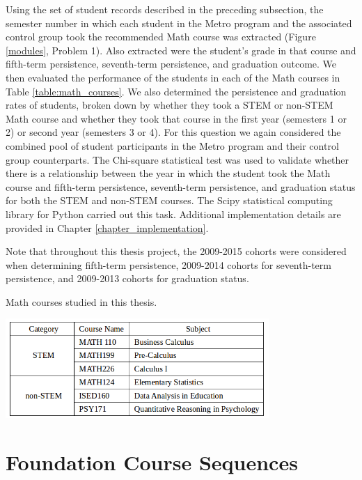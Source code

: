 Using the set of student records described in the preceding subsection, the semester number in which each student in the Metro program and the associated control group took the recommended Math course was extracted (Figure \ref{modules}, Problem 1).  Also extracted were the student's grade in that course and fifth-term persistence, seventh-term persistence, and graduation outcome.  We then evaluated the performance of the students in each of the Math courses in Table \ref{table:math_courses}.  We also determined the persistence and graduation rates of students, broken down by whether they took a STEM or non-STEM Math course and whether they took that course in the first year (semesters 1 or 2) or second year (semesters 3 or 4).  For this question we again considered the combined pool of student participants in the Metro program and their control group counterparts.  The Chi-square statistical test was used to validate whether there is a relationship between the year in which the student took the Math course and fifth-term persistence, seventh-term persistence, and graduation status for both the STEM and non-STEM courses.  The Scipy statistical computing library for Python \cite{Scipy} carried out this task.  Additional implementation details are provided in Chapter \ref{chapter_implementation}.

Note that throughout this thesis project, the 2009-2015 cohorts were considered when determining fifth-term persistence, 2009-2014 cohorts for seventh-term persistence, and 2009-2013 cohorts for graduation status.

\begin{table}[htbp]
\centering
\caption{Math courses studied in this thesis.}
\includegraphics[width=0.75\textwidth]{tables/Table_math.png}
\label{table:math_courses}
\end{table}

\section{Foundation Course Sequences}

